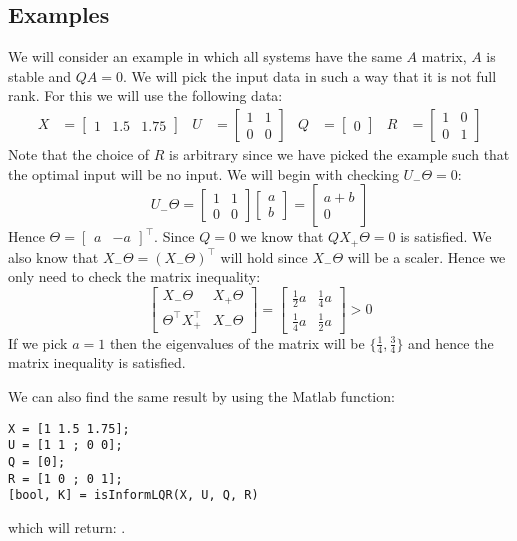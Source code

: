 \subsection{Examples}
We will consider an example in which all systems have the same $A$ matrix, $A$ is stable and $QA = 0$. We will pick the input data in such a way that it is not full rank. For this we will use the following data:
\begin{align*}
X &= \begin{bmatrix} 1&1.5&1.75 \end{bmatrix} & 
U &= \begin{bmatrix} 1&1\\0&0 \end{bmatrix} & 
Q &= \begin{bmatrix} 0 \end{bmatrix} &
R &= \begin{bmatrix} 1&0\\0&1 \end{bmatrix}
\end{align*} 
Note that the choice of $R$ is arbitrary since we have picked the example such that the optimal input will be no input. We will begin with checking $U_- \Theta = 0$:
\begin{equation*}
U_- \Theta = \begin{bmatrix} 1&1\\0&0 \end{bmatrix}\begin{bmatrix} a\\b \end{bmatrix} = \begin{bmatrix} a + b\\0 \end{bmatrix}
\end{equation*}
Hence $\Theta = \begin{bmatrix} a & -a \end{bmatrix}^\top$. Since $Q = 0$ we know that $QX_+\Theta = 0$ is satisfied. We also know that $X_-\Theta = (X_-\Theta)^\top$ will hold since $X_-\Theta$ will be a scaler. Hence we only need to check the matrix inequality:
\[ \begin{bmatrix} X_-\Theta & X_+\Theta \\ \Theta^\top X_+^\top & X_-\Theta \end{bmatrix} = 
\begin{bmatrix} \frac{1}{2} a & \frac{1}{4} a \\ \frac{1}{4} a & \frac{1}{2} a \end{bmatrix}
 > 0 \]
If we pick $a = 1$ then the eigenvalues of the matrix will be $\{\frac{1}{4}, \frac{3}{4}\}$ and hence the matrix inequality is satisfied.


We can also find the same result by using the Matlab function:
\begin{lstlisting}
X = [1 1.5 1.75];
U = [1 1 ; 0 0];
Q = [0];
R = [1 0 ; 0 1];
[bool, K] = isInformLQR(X, U, Q, R)
\end{lstlisting}
which will return: \mon{[ 1, [0 ; 0] ]}.
